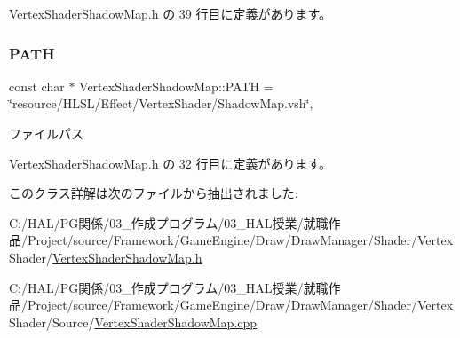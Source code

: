 Vertex\+Shader\+Shadow\+Map.\+h の 39 行目に定義があります。

\mbox{\label{class_vertex_shader_shadow_map_a3520e12e1b04f87f1f8e2c90e637e8d0}} 
\subsubsection{\texorpdfstring{P\+A\+TH}{PATH}}
{\footnotesize\ttfamily const char $\ast$ Vertex\+Shader\+Shadow\+Map\+::\+P\+A\+TH = \char`\"{}resource/H\+L\+SL/Effect/Vertex\+Shader/Shadow\+Map.\+vsh\char`\"{}\hspace{0.3cm}{\ttfamily [static]}, {\ttfamily [private]}}



ファイルパス 



 Vertex\+Shader\+Shadow\+Map.\+h の 32 行目に定義があります。



このクラス詳解は次のファイルから抽出されました\+:\begin{DoxyCompactItemize}
\item 
C\+:/\+H\+A\+L/\+P\+G関係/03\+\_\+作成プログラム/03\+\_\+\+H\+A\+L授業/就職作品/\+Project/source/\+Framework/\+Game\+Engine/\+Draw/\+Draw\+Manager/\+Shader/\+Vertex\+Shader/\mbox{\hyperlink{_vertex_shader_shadow_map_8h}{Vertex\+Shader\+Shadow\+Map.\+h}}\item 
C\+:/\+H\+A\+L/\+P\+G関係/03\+\_\+作成プログラム/03\+\_\+\+H\+A\+L授業/就職作品/\+Project/source/\+Framework/\+Game\+Engine/\+Draw/\+Draw\+Manager/\+Shader/\+Vertex\+Shader/\+Source/\mbox{\hyperlink{_vertex_shader_shadow_map_8cpp}{Vertex\+Shader\+Shadow\+Map.\+cpp}}\end{DoxyCompactItemize}
